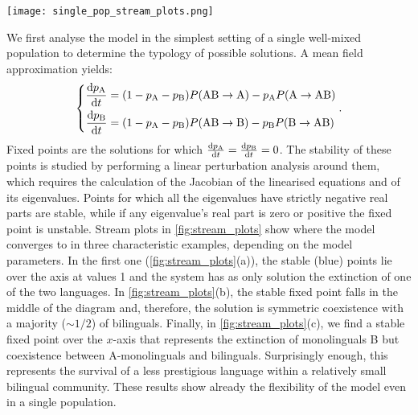 \documentclass[../thesis.tex]{subfiles}
\begin{document}
\begin{figure*}
  \centering
  \texttt{[image: single\_pop\_stream\_plots.png]}
  \caption{Flow diagrams for the dynamics of two languages according to our model
  described in \cref{eq:bipref_model} set in a well-mixed population. $p_{\text{A}}$
  and $p_{\text{B}}$ denote the proportions of monolinguals in A and B, respectively,
  and the proportion of bilinguals $p_{\text{AB}}$ is such that $p_{\text{A}} +
  p_{\text{B}} + p_{\text{AB}} = 1$. The mortality rate is fixed at $\mu = 0.02$. (a)
  For $s = q = 1/2$ and $c=0.02$, the stable outcome is extinction of one of the two
  languages. (b) For $s = q = 1/2$ and $c = 0.05$, the higher learning rate leads to a
  solution featuring stable coexistence. (c) For $s = 0.57$, $q = 0.45$ and $c =
  0.05$, despite the lower prestige, B survives in a small community of bilinguals as
  it is the preferred language among them.}
  \label{fig:stream_plots}
\end{figure*}

We first analyse the model in the simplest setting of a single well-mixed population to
determine the typology of possible solutions. A mean field approximation yields:
\begin{equation}
  \label{eq:dt_bipref_model}
  \left\{
  \begin{aligned}
    \dv{p_\text{A}}{t} &= (1 - p_\text{A} - p_\text{B}) P (\text{AB} \rightarrow \text{A})
        - p_\text{A} P (\text{A} \rightarrow \text{AB})
    \\
    \dv{p_\text{B}}{t} &= (1 - p_\text{A} - p_\text{B}) P (\text{AB} \rightarrow \text{B})
        - p_\text{B} P (\text{B} \rightarrow \text{AB})
  \end{aligned}
    \right. .
\end{equation}
Fixed points are the solutions for which $\dv{p_\text{A}}{t} = \dv{p_\text{B}}{t} = 0$.
The stability of these points is studied by performing a linear perturbation analysis
around them, which requires the calculation of the Jacobian of the linearised equations
and of its eigenvalues. Points for which all the eigenvalues have strictly negative real
parts are stable, while if any eigenvalue's real part is zero or positive the fixed
point is unstable. Stream plots in \cref{fig:stream_plots} show where the model
converges to in three characteristic examples, depending on the model parameters. In the
first one (\cref{fig:stream_plots}(a)), the stable (blue) points lie over the axis at
values 1 and the system has as only solution the extinction of one of the two languages.
In \cref{fig:stream_plots}(b), the stable fixed point falls in the middle of the diagram
and, therefore, the solution is symmetric coexistence with a majority ($\sim 1/2$) of
bilinguals. Finally, in \cref{fig:stream_plots}(c), we find a stable fixed point over
the $x$-axis that represents the extinction of monolinguals B but coexistence between
A-monolinguals and bilinguals. Surprisingly enough, this represents the survival of a
less prestigious language within a relatively small bilingual community. These results
show already the flexibility of the model even in a single population.
\end{document}
